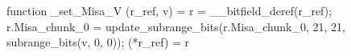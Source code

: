 function _set_Misa_V (r_ref, v) = {
    r = __bitfield_deref(r_ref);
    r.Misa_chunk_0 = update_subrange_bits(r.Misa_chunk_0, 21, 21, subrange_bits(v, 0, 0));
    (*r_ref) = r
}
